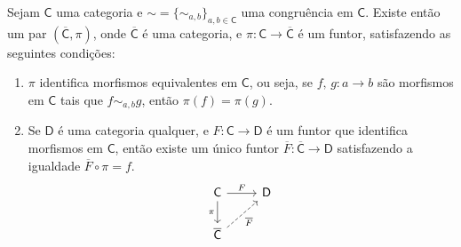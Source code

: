 \begin{teo}\label{teo:existencia_categoria_quociente}
    Sejam $\mathsf{C}$ uma categoria e $\sim = \{\sim_{a,b}\}_{a,b \in \mathsf{C}}$ uma congruência em $\mathsf{C}$.
    Existe então um par $(\overline{\mathsf{C}},\pi)$, onde $\overline{\mathsf{C}}$ é uma categoria, e $\pi: \mathsf{C} \to \overline{\mathsf{C}}$ é um funtor, satisfazendo as seguintes condições:
    \begin{enumerate}
        \item $\pi$ identifica morfismos equivalentes em $\mathsf{C}$, ou seja, se $f,\,g: a \to b$ são morfismos em $\mathsf{C}$ tais que $f \sim_{a,b} g$, então $\pi(f) = \pi(g)$.

        \item Se $\mathsf{D}$ é uma categoria qualquer, e $F: \mathsf{C} \to \mathsf{D}$ é um funtor que identifica morfismos em $\mathsf{C}$, então existe um único funtor $\overline{F}: \overline{\mathsf{C}} \to \mathsf{D}$ satisfazendo a igualdade $\overline{F} \circ \pi = f$.
        \begin{displaymath}
            \begin{tikzcd}
                \mathsf{C}
                \arrow[r, "F"]
                \arrow[d, "\pi" swap]
                & \mathsf{D}
                \\ \overline{\mathsf{C}}
                \arrow[ru, dashed, "\overline{F}" swap]
            \end{tikzcd}
        \end{displaymath}
    \end{enumerate}
\end{teo}

